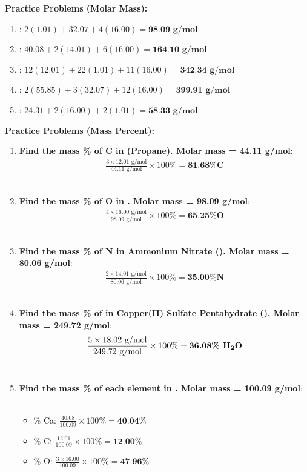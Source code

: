 \documentclass{article}
\begin{document}
\textbf{Practice Problems (Molar Mass):}
\begin{enumerate}[itemsep=5pt]
    \item \textbf{}: $2(1.01) + 32.07 + 4(16.00) = \textbf{98.09 g/mol}$
    \item \textbf{}: $40.08 + 2(14.01) + 6(16.00) = \textbf{164.10 g/mol}$
    \item \textbf{}: $12(12.01) + 22(1.01) + 11(16.00) = \textbf{342.34 g/mol}$
    \item \textbf{}: $2(55.85) + 3(32.07) + 12(16.00) = \textbf{399.91 g/mol}$
    \item \textbf{}: $24.31 + 2(16.00) + 2(1.01) = \textbf{58.33 g/mol}$
\end{enumerate}

\textbf{Practice Problems (Mass Percent):}
\begin{enumerate}[itemsep=5pt]
    \item \textbf{Find the mass \% of C in  (Propane). Molar mass = 44.11 g/mol}:
    \begin{align*} \frac{3 \times 12.01 \text{ g/mol}}{44.11 \text{ g/mol}} \times 100\% = \textbf{81.68\% C} \end{align*}
    \item \textbf{Find the mass \% of O in . Molar mass = 98.09 g/mol}:
    \begin{align*} \frac{4 \times 16.00 \text{ g/mol}}{98.09 \text{ g/mol}} \times 100\% = \textbf{65.25\% O} \end{align*}
    \item \textbf{Find the mass \% of N in Ammonium Nitrate (). Molar mass = 80.06 g/mol}:
    \begin{align*} \frac{2 \times 14.01 \text{ g/mol}}{80.06 \text{ g/mol}} \times 100\% = \textbf{35.00\% N} \end{align*}
    \item \textbf{Find the mass \% of  in Copper(II) Sulfate Pentahydrate (). Molar mass = 249.72 g/mol}:
    \begin{align*} \frac{5 \times 18.02 \text{ g/mol}}{249.72 \text{ g/mol}} \times 100\% = \textbf{36.08\% \ce{H2O}} \end{align*}
    \item \textbf{Find the mass \% of each element in . Molar mass = 100.09 g/mol}:
    \begin{itemize}
        \item \% Ca: $\frac{40.08}{100.09} \times 100\% = \textbf{40.04\%}$
        \item \% C: $\frac{12.01}{100.09} \times 100\% = \textbf{12.00\%}$
        \item \% O: $\frac{3 \times 16.00}{100.09} \times 100\% = \textbf{47.96\%}$
    \end{itemize}
\end{enumerate}
\end{document}
